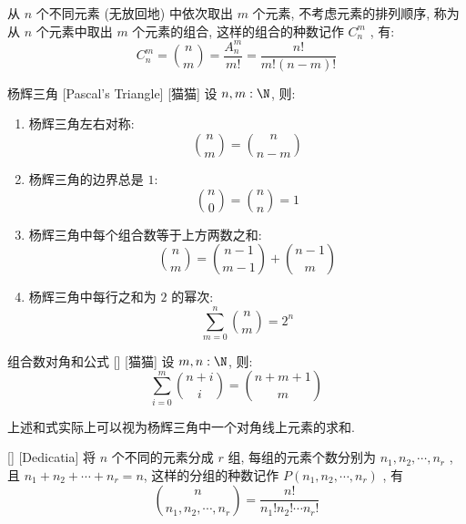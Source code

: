 \documentclass[UTF8]{ctexart}
\begin{document}
        \begin{prf}
            从 \(n\) 个不同元素 (无放回地) 中依次取出 \(m\) 个元素, 不考虑元素的排列顺序, 称为从 \(n\) 个元素中取出 \(m\) 个元素的组合, 这样的组合的种数记作 \(C_n^m\) , 有: 
            \[C_n^m=\binom{n}{m}=\frac{A_n^m}{m!}=\frac{n!}{m!(n-m)!}\]
        \end{prf}

        \begin{ppt}
            []
            {杨辉三角}
            [Pascal's Triangle]
            [猫猫]
            设 \(n, m:\N\), 则:
            \begin{enumerate}
                \item 杨辉三角左右对称: 
                    \[\binom{n}{m}=\binom{n}{n-m}\]
                \item 杨辉三角的边界总是 \(1\): 
                    \[\binom{n}{0}=\binom{n}{n}=1\]
                \item 杨辉三角中每个组合数等于上方两数之和: 
                    \[\binom{n}{m}=\binom{n-1}{m-1}+\binom{n-1}{m}\]
                \item 杨辉三角中每行之和为 \(2\) 的幂次:
                    \[\sum_{m=0}^{n}\binom{n}{m}=2^n\]
            \end{enumerate}
        \end{ppt}

        \begin{ppt}
            []
            {组合数对角和公式}
            []
            [猫猫]
            设 \(m, n:\N\), 则:
            \[\sum_{i=0}^{m}\binom{n+i}{i}=\binom{n+m+1}{m}\]
        \end{ppt}

        \begin{rmk}
            [猫猫]
            上述和式实际上可以视为杨辉三角中一个对角线上元素的求和. 
        \end{rmk}

        \begin{xmp}
            []
            {}
            []
            [Dedicatia]
            将 \(n\) 个不同的元素分成 \(r\) 组, 每组的元素个数分别为 \(n_1,n_2,\cdots,n_r\) , 且 \(n_1+n_2+\cdots+n_r=n\), 这样的分组的种数记作 \(P(n_1,n_2,\cdots,n_r)\) , 有
            \[\binom{n}{n_1,n_2,\cdots,n_r}=\frac{n!}{n_1!n_2!\cdots n_r!}\]
        \end{xmp}
    
        
\end{document}
